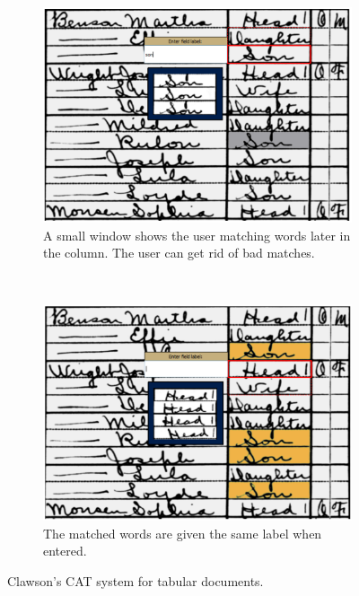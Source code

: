 \documentclass[ms]{byuprop}
\begin{document}
\begin{figure}[h]
    \centering
    \begin{subfigure}[t]{0.46\textwidth}
    		\centering
    		\includegraphics[width=\textwidth]{ii_ex_a}
    		\caption{A small window shows the user matching words later in the column. The user can get rid of bad matches.}
    	\end{subfigure}
    	~
    	\begin{subfigure}[t]{0.46\textwidth}
    		\centering
    		\includegraphics[width=\textwidth]{ii_ex_b}
    		\caption{The matched words are given the same label when entered.}
    	\end{subfigure}
    	\caption{Clawson's CAT system for tabular documents.}
    	\label{fig:ii}
\end{figure}
\end{document}
